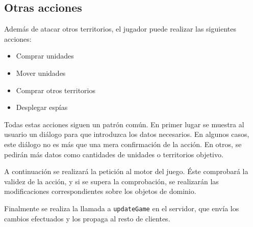 \subsection{Otras acciones}

Además de atacar otros territorios, el jugador puede realizar las siguientes
acciones:

\begin{itemize}
\item Comprar unidades
\item Mover unidades
\item Comprar otros territorios
\item Desplegar espías
\end{itemize}

Todas estas acciones siguen un patrón común. En primer lugar se muestra al
usuario un diálogo para que introduzca los datos necesarios. En algunos casos,
este diálogo no es más que una mera confirmación de la acción. En otros, se
pedirán más datos como cantidades de unidades o territorios objetivo.

A continuación se realizará la petición al motor del juego. Éste comprobará la
validez de la acción, y si se supera la comprobación, se realizarán las
modificaciones correspondientes sobre los objetos de dominio.

Finalmente se realiza la llamada a \texttt{updateGame} en el servidor, que
envía los cambios efectuados y los propaga al resto de clientes.